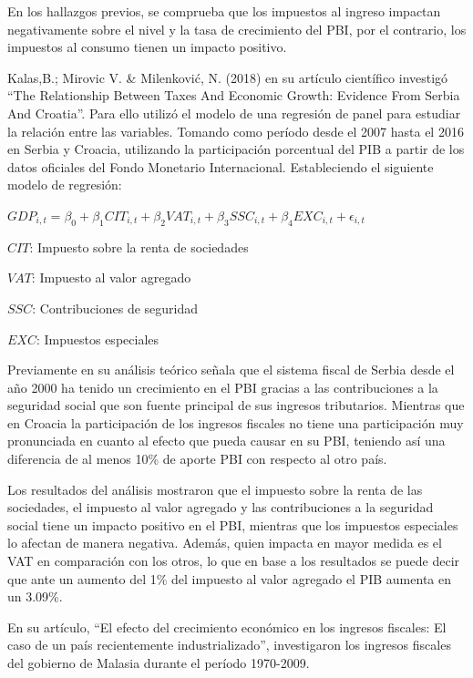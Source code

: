 \documentclass[
  letterpaper,
  DIV=11,
  numbers=noendperiod]{scrartcl}
\begin{document}
En los hallazgos previos, se comprueba que los impuestos al ingreso
impactan negativamente sobre el nivel y la tasa de crecimiento del PBI,
por el contrario, los impuestos al consumo tienen un impacto positivo.

Kalas,B.; Mirovic V. \& Milenković, N. (2018) en su artículo científico
investigó ``The Relationship Between Taxes And Economic Growth: Evidence
From Serbia And Croatia''. Para ello utilizó el modelo de una regresión
de panel para estudiar la relación entre las variables. Tomando como
período desde el 2007 hasta el 2016 en Serbia y Croacia, utilizando la
participación porcentual del PIB a partir de los datos oficiales del
Fondo Monetario Internacional. Estableciendo el siguiente modelo de
regresión:

\(GDP_{i, t} = \beta_{0} + \beta_{1}CIT_{i, t}+ \beta_{2}VAT_{i, t} + \beta_{3}SSC_{i, t} + \beta_{4}EXC_{i, t} + \epsilon_{i, t}\)

\(CIT\): Impuesto sobre la renta de sociedades

\(VAT\): Impuesto al valor agregado

\(SSC\): Contribuciones de seguridad

\(EXC\): Impuestos especiales

Previamente en su análisis teórico señala que el sistema fiscal de
Serbia desde el año 2000 ha tenido un crecimiento en el PBI gracias a
las contribuciones a la seguridad social que son fuente principal de sus
ingresos tributarios. Mientras que en Croacia la participación de los
ingresos fiscales no tiene una participación muy pronunciada en cuanto
al efecto que pueda causar en su PBI, teniendo así una diferencia de al
menos 10\% de aporte PBI con respecto al otro país.

Los resultados del análisis mostraron que el impuesto sobre la renta de
las sociedades, el impuesto al valor agregado y las contribuciones a la
seguridad social tiene un impacto positivo en el PBI, mientras que los
impuestos especiales lo afectan de manera negativa. Además, quien
impacta en mayor medida es el VAT en comparación con los otros, lo que
en base a los resultados se puede decir que ante un aumento del 1\% del
impuesto al valor agregado el PIB aumenta en un 3.09\%.

\textcite{taha_effect_2011} En su artículo, ``El efecto del crecimiento
económico en los ingresos fiscales: El caso de un país recientemente
industrializado'', investigaron los ingresos fiscales del gobierno de
Malasia durante el período 1970-2009.
\end{document}
